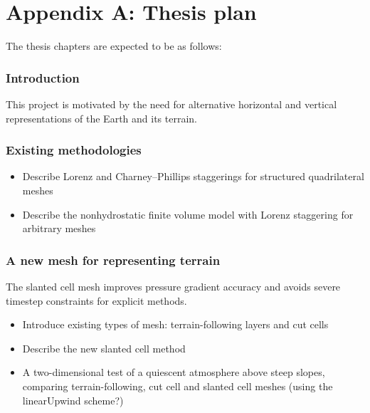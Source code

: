 \documentclass[a4paper,11pt]{article}
\begin{document}
\section*{Appendix A: Thesis plan}
The thesis chapters are expected to be as follows:

\subsubsection*{Introduction}
\noindent This project is motivated by the need for alternative horizontal and vertical representations of the Earth and its terrain.

\subsubsection*{Existing methodologies}
\begin{itemize}[itemsep=0.1em]
	\item Describe Lorenz and Charney--Phillips staggerings for structured quadrilateral meshes
	\item Describe the nonhydrostatic finite volume model with Lorenz staggering for arbitrary meshes \citep{weller-shahrokhi2014}
\end{itemize}

\subsubsection*{A new mesh for representing terrain}
\noindent The slanted cell mesh improves pressure gradient accuracy and avoids severe timestep constraints for explicit methods.
\begin{itemize}[itemsep=0.1em]
	\item Introduce existing types of mesh: terrain-following layers and cut cells
	\item Describe the new slanted cell method
	\item A two-dimensional test of a quiescent atmosphere above steep slopes, comparing terrain-following, cut cell and slanted cell meshes (using the linearUpwind scheme?)
\end{itemize}
\end{document}
